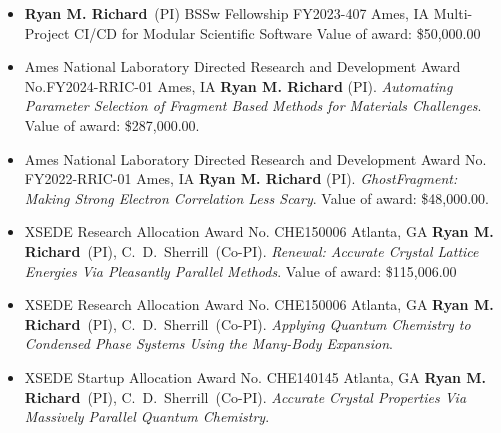 \begin{itemize}
	\item{
		{\textbf{Ryan M. Richard}\ (PI)}
		{BSSw Fellowship FY2023-407}
		{Ames, IA}
		{}
		{Multi-Project CI/CD for Modular Scientific Software}
		{Value of award: \$50,000.00}
		{}
	}
	\item{
		{Ames National Laboratory Directed Research and Development}
		{Award No.FY2024-RRIC-01}
		{Ames, IA}
		{}
		{\textbf{Ryan M. Richard} (PI).  
		 \textit{Automating Parameter Selection of Fragment Based Methods for 
		         Materials Challenges}.
		 Value of award: \$287,000.00.
		}
	}
	\item{
		{Ames National Laboratory Directed Research and Development}
		{Award No. FY2022-RRIC-01}
		{Ames, IA}
		{}
		{\textbf{Ryan M. Richard} (PI).  
		 \textit{GhostFragment: Making Strong Electron Correlation Less Scary}.
		 Value of award: \$48,000.00.
		}
	}
	\item{
          {XSEDE Research Allocation}
          {Award No. CHE150006}
          {Atlanta, GA}
          {}
          {\textbf{Ryan M. Richard}\ (PI), C.~D.~Sherrill\ (Co-PI).
		   \textit{Renewal: Accurate Crystal Lattice Energies Via Pleasantly 
		           Parallel Methods}.
          Value of award: \$115,006.00}
    }
	\item{
          {XSEDE Research Allocation}
          {Award No. CHE150006}
          {Atlanta, GA}
          {}
          {\textbf{Ryan M. Richard}\ (PI), C.~D.~Sherrill\ (Co-PI).
		   \textit{Applying Quantum Chemistry to Condensed Phase Systems Using 
		           the Many-Body Expansion}.
          }
    }
	\item{
          {XSEDE Startup Allocation}
          {Award No. CHE140145}
          {Atlanta, GA}
          {}
          {\textbf{Ryan M. Richard}\ (PI), C.~D.~Sherrill\ (Co-PI).
		   \textit{Accurate Crystal Properties Via Massively Parallel Quantum 
		           Chemistry}.
          }
    }
\end{itemize}

%


